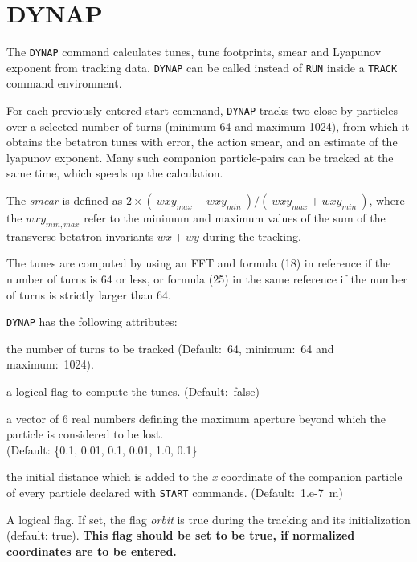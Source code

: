 
\section{DYNAP}

The \texttt{DYNAP} command calculates tunes, tune footprints, smear and
Lyapunov exponent from tracking data. \texttt{DYNAP} can be called
instead of \texttt{RUN} inside a \texttt{TRACK} command environment.

 
For each previously entered start command, \texttt{DYNAP} tracks two
close-by particles over a selected number of turns (minimum 64 and 
maximum 1024), from which it obtains the betatron tunes with error, 
the action smear, and an estimate of the lyapunov exponent. 
Many such companion particle-pairs can be tracked at the same time,
which speeds up the calculation.

The \textit{smear} is defined as  
$2 \times (\ wxy_{max} - wxy_{min}\ ) / (\ wxy_{max} + wxy_{min}\ )$,
where the $wxy_{min,max}$ refer to the  minimum and
maximum values of the sum of the transverse betatron invariants
$wx+wy$ during the tracking. 

The tunes are computed by using an FFT and formula (18) in reference 
\cite{bartolini1995} if the number of turns is 64 or less, or formula (25) in 
the same reference if the number of turns is strictly larger than 64.
 
\texttt{DYNAP} has the following attributes: 
\begin{madlist}
    the number of turns to be tracked (Default:~64,
   minimum:~64 and maximum:~1024). 
     
    a logical flag to compute the tunes. (Default:~false)
 
    a vector of 6 real numbers defining the maximum
   aperture beyond which the particle is considered to be lost.\\
   (Default: \{0.1, 0.01, 0.1, 0.01, 1.0, 0.1\}
     
    the initial distance which is added to the
   \textit{x} coordinate of the companion particle of every particle
   declared with \texttt{START} commands. (Default:~1.e-7~m)
   
    A logical flag. If set, the flag \textit{orbit} 
   is true during the tracking and its initialization
   (default: true).
   \textbf{This flag should be set to be true, if 
     normalized coordinates are to be entered.}
\end{madlist}

